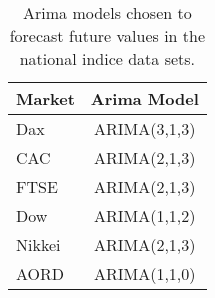 \begin{table}[ht]
\centering
\caption[Arima models chosen for the indice data sets]{Arima models chosen to forecast future values in the national indice data sets.} 
\label{tab:chp_ts_arima_models_chp6}
\begin{tabular}{lc}
  \toprule Market & Arima Model \\ 
  \midrule Dax & ARIMA(3,1,3)                    \\ 
  CAC & ARIMA(2,1,3)                    \\ 
  FTSE & ARIMA(2,1,3)                    \\ 
  Dow & ARIMA(1,1,2)                    \\ 
  Nikkei & ARIMA(2,1,3)                    \\ 
  AORD & ARIMA(1,1,0)                    \\ 
   \bottomrule \end{tabular}
\end{table}
